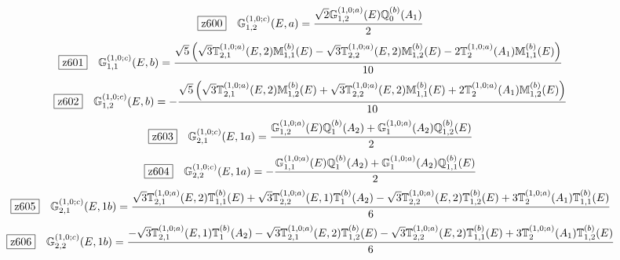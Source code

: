 \documentclass[fleqn,10pt,landscape]{jsarticle}
\begin{document}
\begin{dmath*}
\hspace*{3mm}\fbox{z600}\quad \mathbb{G}_{1,2}^{(1,0;c)}(E,a)=\frac{\sqrt{2} \mathbb{G}_{1,2}^{(1,0;a)}(E) \mathbb{Q}_{0}^{(b)}(A_{1})}{2}
\end{dmath*}
\begin{dmath*}
\hspace*{3mm}\fbox{z601}\quad \mathbb{G}_{1,1}^{(1,0;c)}(E,b)=\frac{\sqrt{5} \left(\sqrt{3} \mathbb{T}_{2,1}^{(1,0;a)}(E,2) \mathbb{M}_{1,1}^{(b)}(E) - \sqrt{3} \mathbb{T}_{2,2}^{(1,0;a)}(E,2) \mathbb{M}_{1,2}^{(b)}(E) - 2 \mathbb{T}_{2}^{(1,0;a)}(A_{1}) \mathbb{M}_{1,1}^{(b)}(E)\right)}{10}
\end{dmath*}
\begin{dmath*}
\hspace*{3mm}\fbox{z602}\quad \mathbb{G}_{1,2}^{(1,0;c)}(E,b)=- \frac{\sqrt{5} \left(\sqrt{3} \mathbb{T}_{2,1}^{(1,0;a)}(E,2) \mathbb{M}_{1,2}^{(b)}(E) + \sqrt{3} \mathbb{T}_{2,2}^{(1,0;a)}(E,2) \mathbb{M}_{1,1}^{(b)}(E) + 2 \mathbb{T}_{2}^{(1,0;a)}(A_{1}) \mathbb{M}_{1,2}^{(b)}(E)\right)}{10}
\end{dmath*}
\begin{dmath*}
\hspace*{3mm}\fbox{z603}\quad \mathbb{G}_{2,1}^{(1,0;c)}(E,1a)=\frac{\mathbb{G}_{1,2}^{(1,0;a)}(E) \mathbb{Q}_{1}^{(b)}(A_{2}) + \mathbb{G}_{1}^{(1,0;a)}(A_{2}) \mathbb{Q}_{1,2}^{(b)}(E)}{2}
\end{dmath*}
\begin{dmath*}
\hspace*{3mm}\fbox{z604}\quad \mathbb{G}_{2,2}^{(1,0;c)}(E,1a)=- \frac{\mathbb{G}_{1,1}^{(1,0;a)}(E) \mathbb{Q}_{1}^{(b)}(A_{2}) + \mathbb{G}_{1}^{(1,0;a)}(A_{2}) \mathbb{Q}_{1,1}^{(b)}(E)}{2}
\end{dmath*}
\begin{dmath*}
\hspace*{3mm}\fbox{z605}\quad \mathbb{G}_{2,1}^{(1,0;c)}(E,1b)=\frac{\sqrt{3} \mathbb{T}_{2,1}^{(1,0;a)}(E,2) \mathbb{T}_{1,1}^{(b)}(E) + \sqrt{3} \mathbb{T}_{2,2}^{(1,0;a)}(E,1) \mathbb{T}_{1}^{(b)}(A_{2}) - \sqrt{3} \mathbb{T}_{2,2}^{(1,0;a)}(E,2) \mathbb{T}_{1,2}^{(b)}(E) + 3 \mathbb{T}_{2}^{(1,0;a)}(A_{1}) \mathbb{T}_{1,1}^{(b)}(E)}{6}
\end{dmath*}
\begin{dmath*}
\hspace*{3mm}\fbox{z606}\quad \mathbb{G}_{2,2}^{(1,0;c)}(E,1b)=\frac{- \sqrt{3} \mathbb{T}_{2,1}^{(1,0;a)}(E,1) \mathbb{T}_{1}^{(b)}(A_{2}) - \sqrt{3} \mathbb{T}_{2,1}^{(1,0;a)}(E,2) \mathbb{T}_{1,2}^{(b)}(E) - \sqrt{3} \mathbb{T}_{2,2}^{(1,0;a)}(E,2) \mathbb{T}_{1,1}^{(b)}(E) + 3 \mathbb{T}_{2}^{(1,0;a)}(A_{1}) \mathbb{T}_{1,2}^{(b)}(E)}{6}
\end{dmath*}
\end{document}
